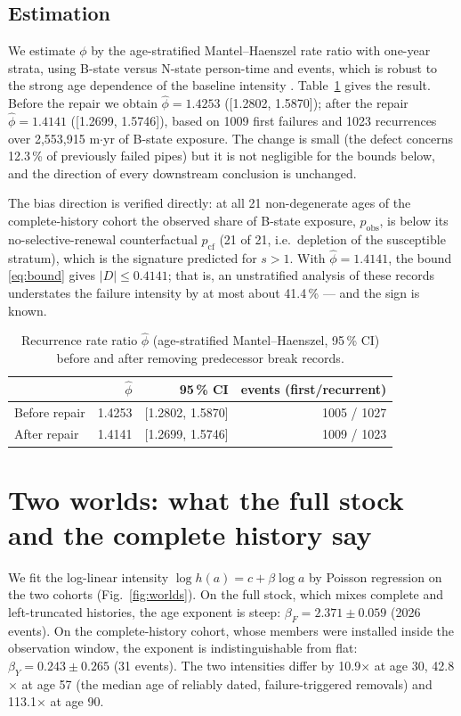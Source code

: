\documentclass[review,12pt,authoryear]{elsarticle}
\begin{document}
\subsection{Estimation}
We estimate $\phi$ by the age-stratified Mantel--Haenszel rate ratio
\citep{Mantel1959} with one-year strata, using B-state versus N-state
person-time and events, which is robust to the strong age dependence of the
baseline intensity \citep{Cox1972}. Table~\ref{tab:phi} gives the result.
Before the repair we obtain $\hat\phi = 1.4253$ ([1.2802, 1.5870]); after the
repair $\hat\phi = 1.4141$ ([1.2699, 1.5746]), based on 1009 first
failures and 1023 recurrences over 2,553,915 m$\cdot$yr of B-state
exposure. The change is small (the defect concerns 12.3\,\% of
previously failed pipes) but it is not negligible for the bounds below, and
the direction of every downstream conclusion is unchanged.

The bias direction is verified directly: at all 21 non-degenerate ages
of the complete-history cohort the observed share of B-state exposure,
$p_{\mathrm{obs}}$, is below its no-selective-renewal counterfactual
$p_{\mathrm{cf}}$ (21 of 21, i.e.\ depletion of the susceptible
stratum), which is the signature predicted for $s>1$. With
$\hat\phi = 1.4141$, the bound \eqref{eq:bound} gives
$|D| \le 0.4141$; that is, an unstratified analysis of these records
understates the failure intensity by at most about 41.4\,\% --- and
the sign is known.

\begin{table}[!t]
\centering
\footnotesize
\caption{Recurrence rate ratio $\hat\phi$ (age-stratified
Mantel--Haenszel, 95\,\% CI) before and after removing predecessor break
records.}
\label{tab:phi}
\begin{tabular}{lrrr}
\toprule
 & $\hat\phi$ & 95\,\% CI & events (first/recurrent) \\
\midrule
Before repair & 1.4253 & [1.2802, 1.5870] & 1005 / 1027 \\
After repair  & 1.4141 & [1.2699, 1.5746] & 1009 / 1023 \\
\bottomrule
\end{tabular}
\end{table}

\section{Two worlds: what the full stock and the complete history say}
\label{sec:worlds}

We fit the log-linear intensity $\log h(a) = c + \beta \log a$ by Poisson
regression on the two cohorts (Fig.~\ref{fig:worlds}). On the full stock,
which mixes complete and left-truncated histories, the age exponent is
steep: $\beta_F = 2.371 \pm 0.059$ (2026 events). On the
complete-history cohort, whose members were installed inside the observation
window, the exponent is indistinguishable from flat:
$\beta_Y = 0.243 \pm 0.265$ (31 events). The two intensities
differ by 10.9$\times$ at age 30, 42.8$\times$ at age 57 (the median
age of reliably dated, failure-triggered removals) and 113.1$\times$ at
age 90.
\end{document}
